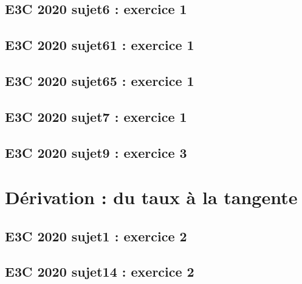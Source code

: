 \documentclass[lang=fr,edition=teacher,layout=sheet]{mxbook}
\begin{document}
\begingroup\endgroup
\par\bigskip
{}\subsection*{E3C 2020 sujet6 : exercice 1}
\begingroup\endgroup
\par\bigskip
{}\subsection*{E3C 2020 sujet61 : exercice 1}
\begingroup\endgroup
\par\bigskip
{}\subsection*{E3C 2020 sujet65 : exercice 1}
\begingroup\endgroup
\par\bigskip
{}\subsection*{E3C 2020 sujet7 : exercice 1}
\begingroup\endgroup
\par\bigskip
{}\subsection*{E3C 2020 sujet9 : exercice 3}
\begingroup\endgroup
\par\bigskip
\clearpage\section*{Dérivation : du taux à la tangente}
\subsection*{E3C 2020 sujet1 : exercice 2}
\begingroup\endgroup
\par\bigskip
{}\subsection*{E3C 2020 sujet14 : exercice 2}
\end{document}
